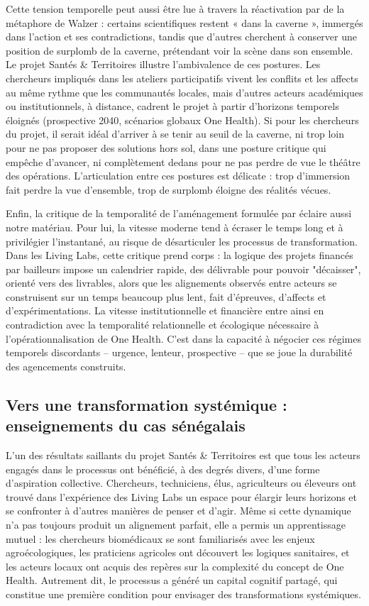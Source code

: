 \documentclass{article}
\begin{document}
Cette tension temporelle peut aussi être lue à travers la réactivation par \textcite{fassin_science_2009} de la métaphore de Walzer : certains scientifiques restent « dans la caverne », immergés dans l’action et ses contradictions, tandis que d’autres cherchent à conserver une position de surplomb de la caverne, prétendant voir la scène dans son ensemble. Le projet Santés \& Territoires illustre l’ambivalence de ces postures. Les chercheurs impliqués dans les ateliers participatifs vivent les conflits et les affects au même rythme que les communautés locales, mais d’autres acteurs académiques ou institutionnels, à distance, cadrent le projet à partir d’horizons temporels éloignés (prospective 2040, scénarios globaux One Health). Si pour les chercheurs du projet, il serait idéal d'arriver à se tenir au seuil de la caverne, ni trop loin pour ne pas proposer des solutions hors sol, dans une posture critique qui empêche d'avancer, ni complètement dedans pour ne pas perdre de vue le théâtre des opérations. L’articulation entre ces postures est délicate : trop d’immersion fait perdre la vue d’ensemble, trop de surplomb éloigne des réalités vécues.

Enfin, la critique de la temporalité de l’aménagement formulée par \textcite{virilio_fin_2023} éclaire aussi notre matériau. Pour lui, la vitesse moderne tend à écraser le temps long et à privilégier l’instantané, au risque de désarticuler les processus de transformation. Dans les Living Labs, cette critique prend corps : la logique des projets financés par bailleurs impose un calendrier rapide, des délivrable pour pouvoir "décaisser", orienté vers des livrables, alors que les alignements observés entre acteurs se construisent sur un temps beaucoup plus lent, fait d’épreuves, d’affects et d’expérimentations. La vitesse institutionnelle et financière entre ainsi en contradiction avec la temporalité relationnelle et écologique nécessaire à l’opérationnalisation de One Health. C’est dans la capacité à négocier ces régimes temporels discordants -- urgence, lenteur, prospective -- que se joue la durabilité des agencements construits.

\subsection{Vers une transformation systémique : enseignements du cas sénégalais}

L’un des résultats saillants du projet Santés \& Territoires est que tous les acteurs engagés dans le processus ont bénéficié, à des degrés divers, d’une forme d’aspiration collective. Chercheurs, techniciens, élus, agriculteurs ou éleveurs ont trouvé dans l’expérience des Living Labs un espace pour élargir leurs horizons et se confronter à d’autres manières de penser et d’agir. Même si cette dynamique n’a pas toujours produit un alignement parfait, elle a permis un apprentissage mutuel : les chercheurs biomédicaux se sont familiarisés avec les enjeux agroécologiques, les praticiens agricoles ont découvert les logiques sanitaires, et les acteurs locaux ont acquis des repères sur la complexité du concept de One Health. Autrement dit, le processus a généré un capital cognitif partagé, qui constitue une première condition pour envisager des transformations systémiques.
\end{document}
